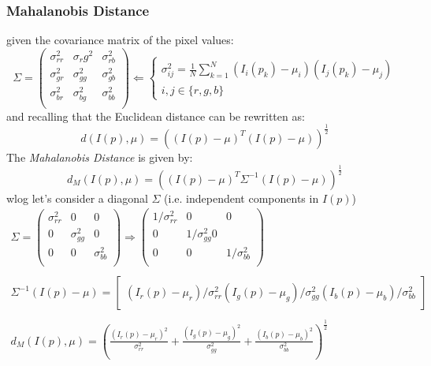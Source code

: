 \documentclass{article}
\begin{document}
\subsubsection{Mahalanobis Distance}
given the covariance matrix of the pixel values:
\[
    \Sigma = \begin{pmatrix}
        \sigma_{rr}^2 & \sigma_rg^2 & \sigma_{rb}^2 \\
        \sigma_{gr}^2 & \sigma_{gg}^2 & \sigma_{gb}^2 \\
        \sigma_{br}^2 & \sigma_{bg}^2 & \sigma_{bb}^2 \\
    \end{pmatrix} \Leftarrow \begin{cases}
        \sigma^2_{ij} = \frac{1}{N}\sum_{k=1}^{N}(I_i(p_k)-\mu_i)(I_j(p_k)-\mu_j)\\
        i,j \in \{r,g,b\}
    \end{cases}
\]
and recalling that the Euclidean distance can be rewritten as:
\[
    d(I(p),\mu) = ((I(p)-\mu)^T(I(p)-\mu))^{\frac{1}{2}}
\]
The \emph{Mahalanobis Distance} is given by:
\[
    d_M(I(p),\mu) = ((I(p)-\mu)^T\Sigma^{-1}(I(p)-\mu))^{\frac{1}{2}}
\]
wlog let's consider a diagonal $\Sigma$ (i.e. independent components in $I(p)$)
\begin{gather*}
    \Sigma = \begin{pmatrix}
        \sigma_{rr}^2 & 0 & 0 \\
        0 & \sigma_{gg}^2 & 0 \\
        0 & 0 & \sigma_{bb}^2 \\
    \end{pmatrix} \Rightarrow \begin{pmatrix}
        1/\sigma_{rr}^2 & 0 & 0 \\
        0 & 1/\sigma_{gg}^2  0 \\
        0 & 0 & 1/\sigma_{bb}^2 \\
    \end{pmatrix} \\ \\
    \Sigma^{-1}(I(p)-\mu) = \begin{bmatrix}
        (I_r(p)-\mu_r)/\sigma_{rr}^2
        (I_g(p)-\mu_g)/\sigma_{gg}^2
        (I_b(p)-\mu_b)/\sigma_{bb}^2
    \end{bmatrix} \\ \\
d_M(I(p),\mu) = \left( \displaystyle\frac{(I_r(p)-\mu_r)^2}{\sigma_{rr}^2} + \displaystyle\frac{(I_g(p)-\mu_g)^2}{\sigma_{gg}^2} + \displaystyle\frac{(I_b(p)-\mu_b)^2}{\sigma_{bb}^2}   \right)^{\frac{1}{2}}
\end{gather*}
\end{document}
